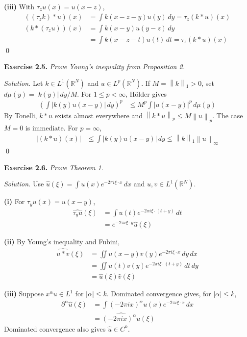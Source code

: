 \documentclass[12pt,letterpaper]{article}
\newcommand{\R}{\mathbb R}
\newcommand{\dx}{\,dx}
\newcommand{\norm}[1]{\left\lVert #1\right\rVert}
\newcommand{\exercise}[1]{%
  \par\bigskip\noindent\textbf{Exercise #1.}\enspace}
\newenvironment{statement}{\itshape\ignorespaces}{\par}
\newcommand{\solution}{\par\medskip\noindent\textit{Solution.}\enspace}
\newcommand{\partlabel}[1]{\par\medskip\noindent\textbf{(#1)}\enspace}
\newcommand{\finish}{\qed\par}
\begin{document}
\partlabel{iii} With $\tau_zu(x)=u(x-z)$,
\begin{align*}
 ((\tau_zk)*u)(x)
 &=\int k(x-z-y)u(y)\,dy=\tau_z(k*u)(x)\\
 (k*(\tau_zu))(x)
 &=\int k(x-y)u(y-z)\,dy\\
 &=\int k(x-z-t)u(t)\,dt=\tau_z(k*u)(x)
\end{align*}
\finish

\begin{samepage}
\exercise{2.5}
\begin{statement}
Prove Young's inequality from Proposition 2.
\end{statement}
\end{samepage}
\solution
Let $k\in L^1(\R^N)$ and $u\in L^p(\R^N)$. If $M=\norm{k}_1>0$,
set $d\mu(y)=|k(y)|\,dy/M$. For $1\leq p<\infty$, H\"older gives
\begin{align*}
 \left(\int|k(y)u(x-y)|\,dy\right)^p
 &\leq M^p\int|u(x-y)|^p\,d\mu(y)
\end{align*}
By Tonelli, $k*u$ exists almost everywhere and
$\norm{k*u}_p\leq M\norm{u}_p$. The case $M=0$ is immediate.
For $p=\infty$,
\begin{align*}
 |(k*u)(x)|&\leq\int|k(y)u(x-y)|\,dy
 \leq\norm{k}_1\norm{u}_\infty
\end{align*}
\finish

\begin{samepage}
\exercise{2.6}
\begin{statement}
Prove Theorem 1.
\end{statement}
\end{samepage}
\solution
Use $\widehat u(\xi)=\int u(x)e^{-2\pi i\xi\cdot x}\dx$ and
$u,v\in L^1(\R^N)$.

\partlabel{i} For $\tau_yu(x)=u(x-y)$,
\begin{align*}
 \widehat{\tau_yu}(\xi)
 &=\int u(t)e^{-2\pi i\xi\cdot(t+y)}\,dt\\
 &=e^{-2\pi i\xi\cdot y}\widehat u(\xi)
\end{align*}

\partlabel{ii} By Young's inequality and Fubini,
\begin{align*}
 \widehat{u*v}(\xi)
 &=\iint u(x-y)v(y)e^{-2\pi i\xi\cdot x}\,dy\dx\\
 &=\iint u(t)v(y)e^{-2\pi i\xi\cdot(t+y)}\,dt\,dy\\
 &=\widehat u(\xi)\widehat v(\xi)
\end{align*}

\partlabel{iii} Suppose $x^\alpha u\in L^1$ for $|\alpha|\leq k$.
Dominated convergence gives, for $|\alpha|\leq k$,
\begin{align*}
 \partial^\alpha\widehat u(\xi)
 &=\int(-2\pi ix)^\alpha u(x)e^{-2\pi i\xi\cdot x}\dx\\
 &=\widehat{(-2\pi ix)^\alpha u}(\xi)
\end{align*}
Dominated convergence also gives $\widehat u\in C^k$.
\end{document}
